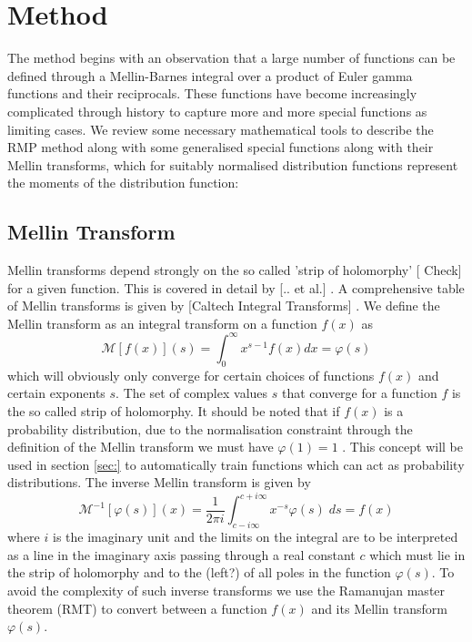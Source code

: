 \documentclass[journal=jcisd8,manuscript=article,layout=onecolumn,pdftex,floatfix,amsmath,amssymb,10pt]{achemso}
\begin{document}
\section{Method}
The method begins with an observation that a large number of functions can be defined through a Mellin-Barnes integral over a product of Euler gamma functions and their reciprocals. These functions have become increasingly complicated through history to capture more and more special functions as limiting cases. We review some necessary mathematical tools to describe the RMP method along with some generalised special functions along with their Mellin transforms, which for suitably normalised distribution functions represent the moments of the distribution function:

\subsection{Mellin Transform}
Mellin transforms depend strongly on the so called 'strip of holomorphy' [{\color{red} Check}] for a given function. This is covered in detail by [.. et al.] \cite{Geerens}. A comprehensive table of Mellin transforms is given by [Caltech Integral Transforms] \cite{}. We define the Mellin transform as an integral transform on a function $f(x)$ as
\begin{equation}
\mathcal{M}[f(x)](s) = \int_0^\infty x^{s-1}f(x) dx = \varphi(s)
\end{equation}
which will obviously only converge for certain choices of functions $f(x)$ and certain exponents $s$. The set of complex values $s$ that converge for a function $f$ is the so called strip of holomorphy. It should be noted that if $f(x)$ is a probability distribution, due to the normalisation constraint through the definition of the Mellin transform we must have $\varphi(1)=1$ \cite{Geerens}. This concept will be used in section \ref{sec:} to automatically train functions which can act as probability distributions. The inverse Mellin transform is given by
\begin{equation}
\mathcal{M}^{-1}[\varphi(s)](x) = \frac{1}{2 \pi i}\int_{c- i \infty}^{c + i \infty} x^{-s} \varphi(s) \; ds = f(x)
\end{equation}
where $i$ is the imaginary unit and the limits on the integral are to be interpreted as a line in the imaginary axis passing through a real constant $c$ which must lie in the strip of holomorphy and to the {\color{red}(left?)} of all poles in the function $\varphi(s)$. To avoid the complexity of such inverse transforms we use the Ramanujan master theorem (RMT) to convert between a function $f(x)$ and its Mellin transform $\varphi(s)$.
\end{document}
